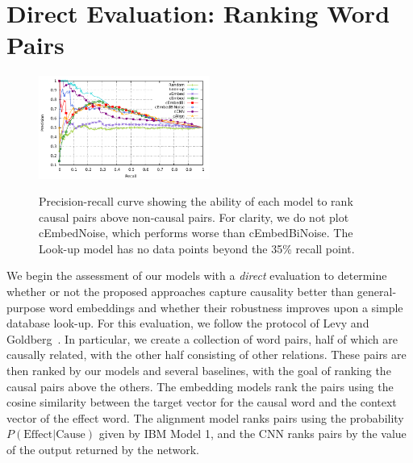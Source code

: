 
\section{Direct Evaluation: Ranking Word Pairs}

\begin{figure}[th!]
\begin{center}
\includegraphics[width=0.50\textwidth]{direct2.pdf} %
\vspace{-3mm}
\caption{{\footnotesize Precision-recall curve showing the ability of each model to rank causal pairs above non-causal pairs. For clarity, we do not plot cEmbedNoise, which performs worse than cEmbedBiNoise. The Look-up model has no data points beyond the 35\% recall point.}}
\vspace{-4mm}
\label{fig:rpcurve_all}
\end{center}
\end{figure}


\label{sec:directeval}

We begin the assessment of our models with a {\em direct} evaluation to determine whether or not the proposed approaches capture causality better than general-purpose word embeddings and whether their robustness improves upon a simple database look-up.
For this evaluation, we follow the protocol of Levy and Goldberg~.  
In particular, we create a collection of word pairs, half of which are causally related, with the other half consisting of other relations. 
These pairs are then ranked by our models and several baselines, with the goal of ranking the causal pairs above the others. 
The embedding models rank the pairs using the cosine similarity between the target vector for the causal word and the context vector of the effect word.  The alignment model ranks pairs using the probability $P(\text{Effect}|\text{Cause})$ given by IBM Model 1, and the CNN ranks pairs by the value of the output returned by the network.

